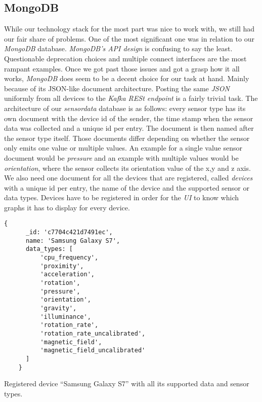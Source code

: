 \subsection{MongoDB}

While our technology stack for the most part was nice to work with, we still had our fair share of
problems. One of the most significant one was in relation to our \textit{MongoDB} database.
\textit{MongoDB’s API design} is confusing to say the least. Questionable deprecation choices and
multiple connect interfaces are the most rampant examples. Once we got past those issues and got a
grasp how it all works, \textit{MongoDB} does seem to be a decent choice for our task at hand.
Mainly because of its JSON-like document architecture. Posting the same \textit{JSON} uniformly from
all devices to the \textit{Kafka RESt endpoint} is a fairly trivial task. The architecture of our
\textit{sensordata} database is as follows: every sensor type has its own document with the device
id of the sender, the time stamp when the sensor data was collected and a unique id per entry. The
document is then named after the sensor type itself. Those documents differ depending on whether the
sensor only emits one value or multiple values. An example for a single value sensor document would
be \textit{pressure} and an example with multiple values would be \textit{orientation}, where the
sensor collects its orientation value of the x,y and z axis. We also need one document for all the
devices that are registered, called \textit{devices} with a unique id per entry, the name of the
device and the supported sensor or data types. Devices have to be registered in order for the
\textit{UI} to know which graphs it has to display for every device.

\begin{code}[H]
  \centering
  \begin{lstlisting}[basicstyle=\small\ttfamily]
    {
      _id: 'c7704c421d7491ec',
      name: 'Samsung Galaxy S7',
      data_types: [
          'cpu_frequency',
          'proximity',
          'acceleration',
          'rotation',
          'pressure',
          'orientation',
          'gravity',
          'illuminance',
          'rotation_rate',
          'rotation_rate_uncalibrated',
          'magnetic_field',
          'magnetic_field_uncalibrated'
      ]
    }
  \end{lstlisting}
  \caption{Registered device “Samsung Galaxy S7” with all its supported data and sensor types.}
\end{code}
